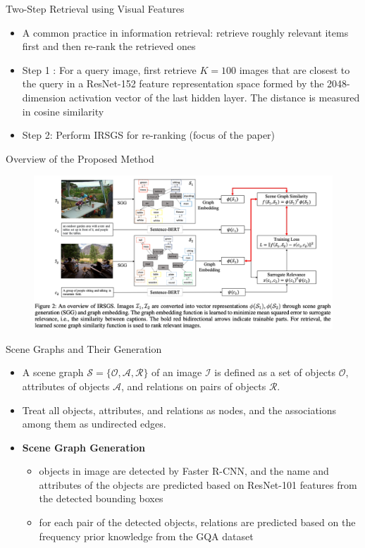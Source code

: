 \documentclass{beamer}
\begin{document}
\begin{frame}{Two-Step Retrieval using Visual Features}
    \begin{itemize}
        \item A common practice in information retrieval: retrieve roughly relevant items first and then re-rank the retrieved ones
        \item Step 1 : For a query image, first retrieve $K=100$ images that are closest to the query in a ResNet-152 feature representation space formed by the 2048-dimension activation vector of the last hidden layer. The distance is measured in cosine similarity
        \item Step 2: Perform IRSGS for re-ranking (focus of the paper)
    \end{itemize}
\end{frame}


\begin{frame}{Overview of the Proposed Method}
\begin{figure}[htpb]
    \centering
    \includegraphics[width=\linewidth]{pic/Retrieval/overview.png}
\end{figure}
\end{frame}


\begin{frame}{Scene Graphs and Their Generation}
\label{sgg}
    \begin{itemize}
        \item A scene graph $\mathcal{S}=\{\mathcal{O}, \mathcal{A}, \mathcal{R}\}$ of an image $\mathcal{I}$ is defined as a set of objects $\mathcal{O}$, attributes of objects $\mathcal{A}$, and relations on pairs of objects $\mathcal{R}$.
        \item Treat all objects, attributes, and relations as nodes, and the associations among them as undirected edges.
        \item \textbf{Scene Graph Generation}
            \begin{itemize}
                \item objects in image are detected by Faster R-CNN, and the name and attributes of the objects are predicted based on ResNet-101 features from the detected bounding boxes
                \item for each pair of the detected objects, relations are predicted based on the frequency prior knowledge from the GQA dataset
            \end{itemize}
    \end{itemize}
\end{frame}
\end{document}
